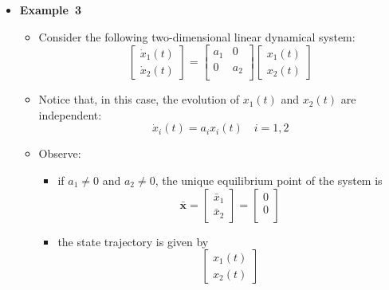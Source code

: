 \documentclass[12pt,a4paper]{article}
\begin{document}
\begin{itemize}
  \clearpage

\item \textbf{Example~3}
  \begin{itemize}
  \item Consider the following two-dimensional linear dynamical system:
    \begin{equation}\nonumber%
      \begin{bmatrix}
        \dot{x}_{1}(t) \\
        \dot{x}_{2}(t)
      \end{bmatrix}
      =
      \begin{bmatrix}
        a_{1} & 0 \\
        0 & a_{2} \\
      \end{bmatrix}
      \begin{bmatrix}
        x_{1}(t) \\
        x_{2}(t)
      \end{bmatrix}
    \end{equation}
  \item Notice that, in this case, the evolution of
    $x_{1}(t)$ and $x_{2}(t)$ are independent:
    \begin{equation}\nonumber%
      \dot{x}_{i}(t) = a_{i}x_{i}(t) \quad i = 1, 2
    \end{equation}
  \item Observe:
    \begin{itemize}
    \item if $a_{1} \neq 0$ and $a_{2} \neq 0$,
      the unique equilibrium point of the system is
      \begin{equation}\nonumber%
        \bar{\bm{x}} =
      \begin{bmatrix}
        \bar{x}_{1} \\
        \bar{x}_{2}
      \end{bmatrix}
      = 
      \begin{bmatrix}
        0 \\
        0 \\
      \end{bmatrix}
      \end{equation}
    \item the state trajectory is given by
      \begin{equation}\nonumber%
      \begin{bmatrix}
        x_{1}(t) \\
        x_{2}(t)

\end{bmatrix}
\end{equation}
\end{itemize}
\end{itemize}
\end{itemize}
\end{document}
